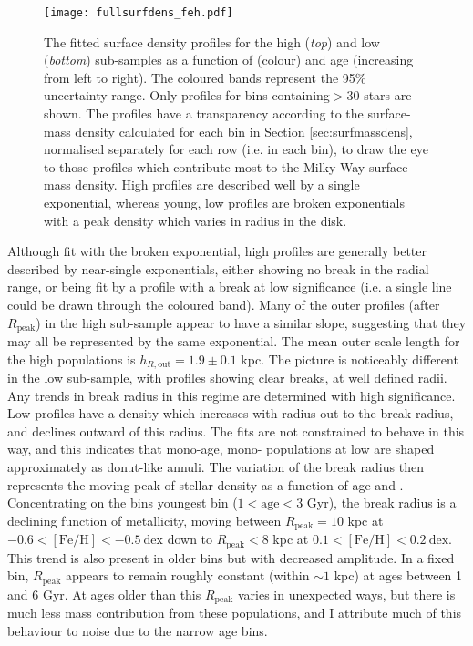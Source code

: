\begin{landscape}
\begin{figure}
\texttt{[image: fullsurfdens\_feh.pdf]}
      \centering
     \caption[Surface density profiles of mono-age, mono-\feh{} populations in the low and high \afe{} disk components of the Milky Way]{The fitted surface density profiles for the high \afe{} (\emph{top}) and low \afe{} (\emph{bottom}) sub-samples as a function of \feh{} (colour) and age (increasing from left to right). The coloured bands represent the 95\% uncertainty range.  Only profiles for bins containing$ > 30$ stars are shown. The profiles have a transparency according to the surface-mass density calculated for each bin in Section \ref{sec:surfmassdens}, normalised separately for each row (i.e. in each \feh{} bin), to draw the eye to those profiles which contribute most to the Milky Way surface-mass density. High \afe{} profiles are described well by a single exponential, whereas young, low \afe{} profiles are broken exponentials with a peak density which varies in radius in the disk.}
     \label{fig:surfdens}
 \end{figure}
\end{landscape}


Although fit with the broken exponential, high \afe{} profiles are generally better described by near-single exponentials, either showing no break in the radial range, or being fit by a profile with a break at low significance (i.e. a single line could be drawn through the coloured band). Many of the outer profiles (after $R_{\mathrm{peak}}$) in the high \afe{} sub-sample appear to have a similar slope, suggesting that they may all be represented by the same exponential. The mean outer scale length for the high \afe{} populations is $h_{R,\text{out}} = 1.9\pm 0.1$ kpc. The picture is noticeably different in the low \afe{} sub-sample, with profiles showing clear breaks, at well defined radii. Any trends in break radius in this regime are determined with high significance. Low \afe{} profiles have a density which increases with radius out to the break radius, and declines outward of this radius. The fits are not constrained to behave in this way, and this indicates that mono-age, mono-\feh{} populations at low \feh{} are shaped approximately as donut-like annuli. The variation of the break radius then represents the moving peak of stellar density as a function of age and \feh{}. Concentrating on the bins youngest bin ($1 < \mathrm{age} < 3$ Gyr), the break radius is a declining function of metallicity, moving between $R_{\mathrm{peak}}=10$ kpc at $-0.6 < \mathrm{[Fe/H]} < -0.5\ \mathrm{dex}$ down to $R_{\mathrm{peak}} < 8$ kpc at $0.1 < \mathrm{[Fe/H]} < 0.2\ \mathrm{dex}$. This trend is also present in older bins but with decreased amplitude. In a fixed \feh{} bin, $R_{\mathrm{peak}}$ appears to remain roughly constant (within $\sim1$ kpc) at ages between 1 and 6 Gyr.  At ages older than this $R_{\mathrm{peak}}$ varies in unexpected ways, but there is much less mass contribution from these populations, and I attribute much of this behaviour to noise due to the narrow age bins. 


